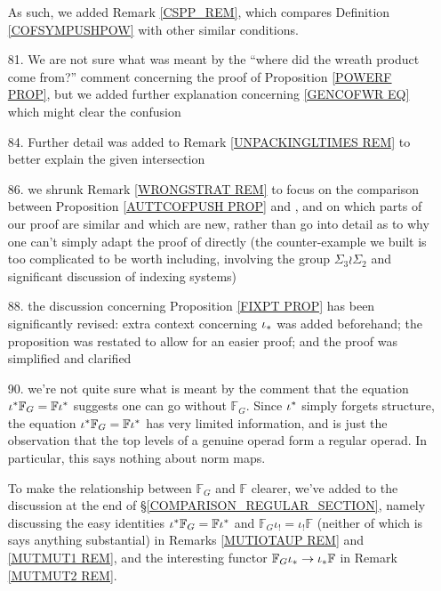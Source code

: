 \documentclass{article}
\begin{document}
\begin{itemize}
	As such, we added Remark \ref{CSPP_REM}, which compares
	Definition \ref{COFSYMPUSHPOW}
	with other similar conditions.


	\item[81.] We are not sure what was meant by the 
	``where did the wreath product come from?'' comment
	concerning the proof of Proposition \ref{POWERF PROP},
	but we added further explanation concerning
	\eqref{GENCOFWR EQ} which might clear the confusion
	
	\item[84.] Further detail was added 
	to Remark \ref{UNPACKINGLTIMES REM} to better explain the given intersection
	
	\item[86.] we shrunk Remark \ref{WRONGSTRAT REM} 
	to focus on the comparison between Proposition \ref{AUTTCOFPUSH PROP} and \cite[Lemma 5.9]{BM08},
	and on which parts of our proof are similar and which are new,
	rather than go into detail as to why one can't simply adapt the proof of \cite[Lemma 5.9]{BM08} directly
	(the counter-example we built 
	is too complicated to be worth including,
	involving the group 
	$\Sigma_3 \wr \Sigma_2$ and 
	significant discussion of indexing systems)	
	
	\item[88.] the discussion concerning Proposition \ref{FIXPT PROP} has been significantly revised: 
	extra context concerning $\iota_{\**}$ was added beforehand; the proposition was restated to allow for an easier proof; and the proof was simplified and clarified

	\item[90.]
	we're not quite sure what is meant by the comment that
	the equation 
	$\iota^{\**} \mathbb{F}_G = \mathbb{F} \iota^{\**}$
	suggests one can go without $\mathbb{F}_G$.
	Since $\iota^{\**}$ simply forgets structure, the equation 
	$\iota^{\**} \mathbb{F}_G = \mathbb{F} \iota^{\**}$
	has very limited information, and is just the observation that the top levels of a genuine operad form a regular operad. 
	In particular, this 
	says nothing about norm maps.
	
	To make the relationship between 
	$\mathbb{F}_G $ and $\mathbb{F}$
	clearer, we've added to the discussion at the end of 
	\S \ref{COMPARISON_REGULAR_SECTION},
	namely discussing the
	easy identities
	$\iota^{\**} \mathbb{F}_G = \mathbb{F} \iota^{\**}$
	and
	$\mathbb{F}_G \iota_! = \iota_! \mathbb{F}$
	(neither of which is says anything substantial)
	in Remarks \ref{MUTIOTAUP REM} and \ref{MUTMUT1 REM},
	and the interesting functor
	$\mathbb{F}_G \iota_{\**} \to \iota_{\**} \mathbb{F}$
	in Remark \ref{MUTMUT2 REM}.
	

\end{itemize}
\end{document}
